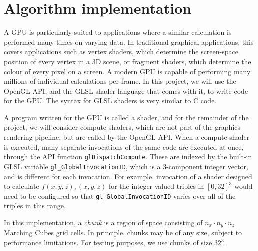 \documentclass{article}
\begin{document}
\section{Algorithm implementation}
A GPU is particularly suited to applications where a similar calculation is performed many times on varying data. In traditional graphical applications, this covers applications such as vertex shaders, which determine the screen-space position of every vertex in a 3D scene, or fragment shaders, which determine the colour of every pixel on a screen. A modern GPU is capable of performing many millions of individual calculations per frame. In this project, we will use the OpenGL API, and the GLSL shader language that comes with it, to write code for the GPU. The syntax for GLSL shaders is very similar to C code. 

A program written for the GPU is called a shader, and for the remainder of the project, we will consider compute shaders, which are not part of the graphics rendering pipeline, but are called by the OpenGL API. When a compute shader is executed, many separate invocations of the same code are executed at once, through the API function \texttt{glDispatchCompute}. These are indexed by the built-in GLSL variable \texttt{gl\_GlobalInvocationID}, which is a 3-component integer vector, and is different for each invocation. For example, invocation of a shader designed to calculate $f\left(x,y,z\right), \left(x,y,z\right)$ for the integer-valued triples in $\left[0,32\right]^3$ would need to be configured so that \texttt{gl\_GlobalInvocationID} varies over all of the triples in this range.

In this implementation, a \textit{chunk} is a region of space consisting of $n_x \cdot n_y \cdot n_z$ Marching Cubes grid cells. In principle, chunks may be of any size, subject to performance limitations. For testing purposes, we use chunks of size $32^3$. 
\end{document}
